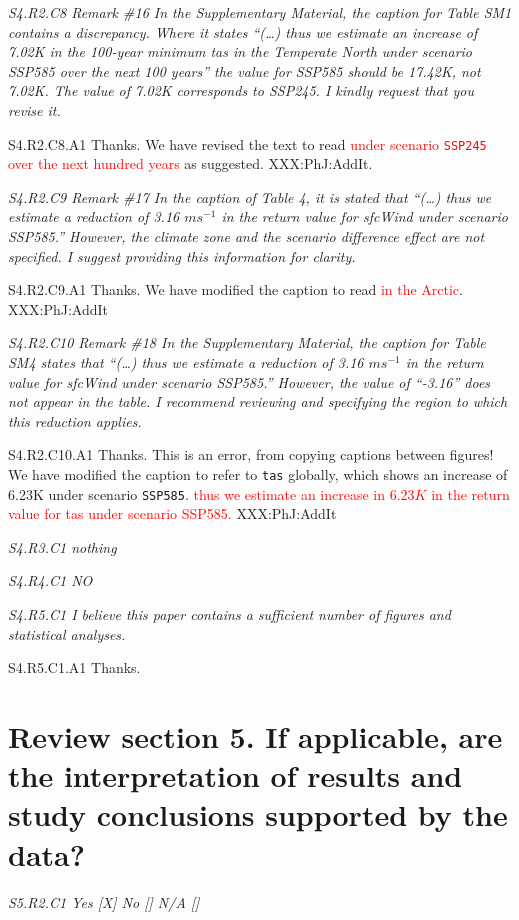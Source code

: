 \documentclass[a4paper,10pt]{article}
\newcommand{\ed}[1]{\textcolor{red}{#1}}
\providecommand{\TA}{\texttt{tas}\xspace}
\providecommand{\SM}{\texttt{SSP245}\xspace}
\providecommand{\SH}{\texttt{SSP585}\xspace}
\begin{document}
	\emph{S4.R2.C8 Remark \#16 In the Supplementary Material, the caption for Table SM1 contains a discrepancy. Where it states “(…) thus we estimate an increase of 7.02K in the 100-year minimum tas in the Temperate North under scenario SSP585 over the next 100 years” the value for SSP585 should be 17.42K, not 7.02K. The value of 7.02K corresponds to SSP245. I kindly request that you revise it.}

	S4.R2.C8.A1 Thanks. We have revised the text to read \ed{under scenario \SM over the next hundred years} as suggested. XXX:PhJ:AddIt.

	\emph{S4.R2.C9 Remark \#17 In the caption of Table 4, it is stated that “(…) thus we estimate a reduction of 3.16 $ms^{-1}$ in the return value for sfcWind under scenario SSP585.” However, the climate zone and the scenario difference effect are not specified. I suggest providing this information for clarity.}

	S4.R2.C9.A1 Thanks. We have modified the caption to read \ed{in the Arctic}. XXX:PhJ:AddIt 

	\emph{S4.R2.C10 Remark \#18 In the Supplementary Material, the caption for Table SM4 states that “(…) thus we estimate a reduction of 3.16 $ms^{-1}$ in the return value for sfcWind under scenario SSP585.” However, the value of “-3.16” does not appear in the table. I recommend reviewing and specifying the region to which this reduction applies.}

	S4.R2.C10.A1 Thanks. This is an error, from copying captions between figures! We have modified the caption to refer to \TA globally, which shows an increase of 6.23K under scenario \SH. \ed{thus we estimate an increase in $6.23K$ in the return value for tas under scenario SSP585.} XXX:PhJ:AddIt

	\emph{S4.R3.C1 nothing}

	\emph{S4.R4.C1 NO}

	\emph{S4.R5.C1 I believe this paper contains a sufficient number of figures and statistical analyses.}
	
	S4.R5.C1.A1 Thanks.

	\section*{Review section 5. If applicable, are the interpretation of results and study conclusions supported by the data?}

	\emph{S5.R2.C1 Yes [X] No [] N/A []}
\end{document}
